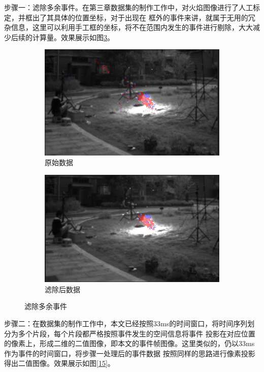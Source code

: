 步骤一：滤除多余事件。在第三章数据集的制作工作中，对火焰图像进行了人工标定，并框出了其具体的位置坐标，对于出现在
框外的事件来讲，就属于无用的冗杂信息，这里可以利用手工框的坐标，将不在范围内发生的事件进行剔除，大大减少后续的计算量。效果展示如图\ref{14}。
\begin{figure}[ht]
    \centering
    \begin{subfigure}{0.49\textwidth}
        \centering
        \includegraphics[width=\textwidth]{figures/extract_process_01.png}
        \caption{原始数据}
        \label{14.a}
    \end{subfigure}
    \hfill
    \begin{subfigure}{0.49\textwidth}
        \centering
        \includegraphics[width=\textwidth]{figures/extract_process_02.png}
        \caption{滤除后数据}
        \label{14.b}
    \end{subfigure}
    \caption{滤除多余事件}
    \label{14}
\end{figure}

步骤二：在数据集的制作工作中，本文已经按照33ms的时间窗口，将时间序列划分为多个片段，每个片段都严格按照事件发生的空间信息将事件
投影在对应位置的像素上，形成二维的二值图像，即本文的事件帧图像。这里类似的，仍以33ms作为事件的时间窗口，将步骤一处理后的事件数据
按照同样的思路进行像素投影得出二值图像。效果展示如图\ref{15}。

